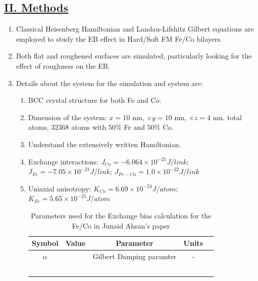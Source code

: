 \subsection*{\underline{II. Methods}}
\begin{enumerate}
    \item Classical Heisenberg Hamiltonian and Landau-Lifshitz Gilbert equations are employed to study the EB effect in Hard/Soft FM Fe/Co bilayers.
    \item Both flat and roughened surfaces are simulated, particularly looking for the effect of roughness on the EB.
    \item Details about the system for the simulation and system are:
    \begin{enumerate} [\ding{212}]
        \item BCC crystal structure for both Fe and Co.
        \item Dimension of the system: $x=10$ nm, $\times y=10$ nm, $\times z=4$ nm. total atoms, 32368 atoms with $50\%$ Fe and $50\%$ Co.
        \item Understand the extensively written Hamiltonian.
        \item Exchange interactions: {$J_{Co}=-6.064\times10^{-21}J/link$}; \\{$J_{Fe}=-7.05\times10^{-21}J/link$}; {$J_{Fe-Co}=1.0\times10^{-22}J/link$}
        \item Uniaxial anisotropy: {$K_{Co}=6.69\times10^{-24}J/atom$}; \\{$K_{Fe}=5.65\times10^{-25}J/atom$}
        \begin{table}
            \centering
            \begin{tabular}{ccccc}\hline \hline
                Symbol & Value & Parameter & Units & \\ \hline 
                $\alpha$ &  & Gilbert Damping paramter  & - & \\
                 &  &  &  & \\
                 &  &  &  & \\
                 &  &  &  & \\
                 &  &  &  & \\
                 &  &  &  & \\ \hline \hline
            \end{tabular} 
            \caption{Parameters used for the Exchange bias calculation for the Fe/Co in Junaid Ahsan's paper}
            \label{tab:Fe/Co_parameter_EB}
        \end{table}

\end{enumerate}
\end{enumerate}
